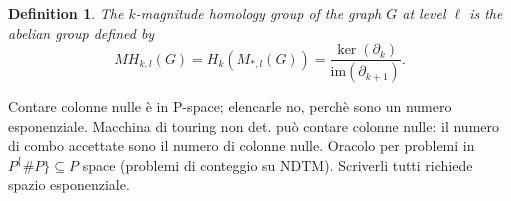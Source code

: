 \documentclass{article}
\newtheorem{definition}{Definition}
\newcommand{\imm}{\mathrm{im}}
\begin{document}
\begin{definition}
	\label{def_MH}
	The $k$-magnitude homology group of the graph $G$ at level $\ell$ is the abelian group defined by
	\[
	MH_{k,l}(G) = H_k(M_{*,l}(G)) = \frac{\ker(\partial_k)}{\imm(\partial_{k+1})}.
	\]
\end{definition}


Contare colonne nulle è in P-space; elencarle no, perchè sono un numero esponenziale. Macchina di touring non det. può contare colonne nulle: il numero di combo accettate sono il numero di colonne nulle. 
Oracolo per problemi in $P^\{\# P\}\subseteq P$ space (problemi di conteggio su NDTM). Scriverli tutti richiede spazio esponenziale.



\end{document}
